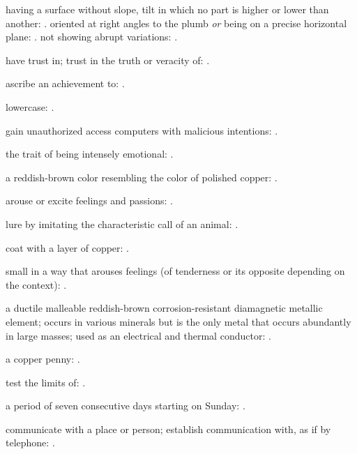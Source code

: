   having a surface without slope, tilt in which no part is higher or lower than another:   . oriented at right angles to the plumb \textit{or} being on a precise horizontal plane: . not showing abrupt variations:   .

  have trust in; trust in the truth or veracity of: .

  ascribe an achievement to:   .

  lowercase:   .

  gain unauthorized access computers with malicious intentions: .

  the trait of being intensely emotional:   .

  a reddish-brown color resembling the color of polished copper:   .

  arouse or excite feelings and passions:   .

  lure by imitating the characteristic call of an animal: .

  coat with a layer of copper: .

  small in a way that arouses feelings (of tenderness or its opposite depending on the context): .

  a ductile malleable reddish-brown corrosion-resistant diamagnetic metallic element; occurs in various minerals but is the only metal that occurs abundantly in large masses; used as an electrical and thermal conductor:   .

  a copper penny: .

  test the limits of:   .

  a period of seven consecutive days starting on Sunday:   .

  communicate with a place or person; establish communication with, as if by telephone: .

